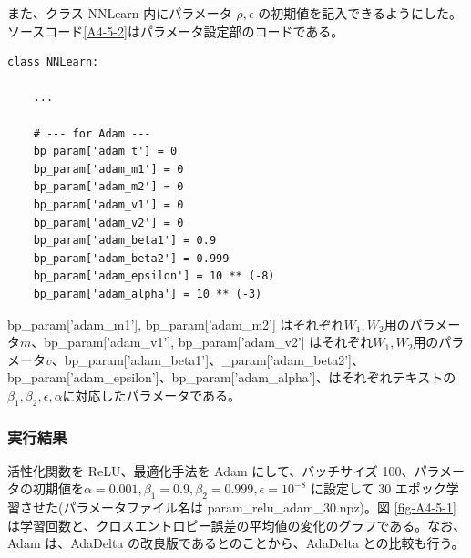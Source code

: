 \documentclass[a4paper,dvipdfmx]{jsarticle}
\begin{document}
また、クラス NNLearn 内にパラメータ $\rho, \epsilon$ の初期値を記入できるようにした。ソースコード\ref{A4-5-2}はパラメータ設定部のコードである。
\begin{lstlisting}[caption="Adam のパラメータ設定部",label=A4-5-2]
class NNLearn:

	...
	
    # --- for Adam ---
    bp_param['adam_t'] = 0
    bp_param['adam_m1'] = 0
    bp_param['adam_m2'] = 0
    bp_param['adam_v1'] = 0
    bp_param['adam_v2'] = 0
    bp_param['adam_beta1'] = 0.9
    bp_param['adam_beta2'] = 0.999
    bp_param['adam_epsilon'] = 10 ** (-8)
    bp_param['adam_alpha'] = 10 ** (-3)
\end{lstlisting}

bp\_param['adam\_m1'], bp\_param['adam\_m2'] はそれぞれ$W_1, W_2$用のパラメータ$m$、bp\_param['adam\_v1'], bp\_param['adam\_v2'] はそれぞれ$W_1, W_2$用のパラメータ$v$、bp\_param['adam\_beta1']、\_param['adam\_beta2']、bp\_param['adam\_epsilon']、bp\_param['adam\_alpha']、はそれぞれテキストの$\beta_1, \beta_2, \epsilon, \alpha$に対応したパラメータである。

\subsubsection*{実行結果}

活性化関数を ReLU、最適化手法を Adam にして、バッチサイズ 100、パラメータの初期値を$\alpha = 0.001, \beta_1 = 0.9, \beta_2 = 0.999, \epsilon = 10^{-8}$ に設定して 30 エポック学習させた(パラメータファイル名は param\_relu\_adam\_30.npz)。図 \ref{fig-A4-5-1} は学習回数と、クロスエントロピー誤差の平均値の変化のグラフである。なお、Adam は、AdaDelta の改良版であるとのことから、AdaDelta との比較も行う。
\end{document}
